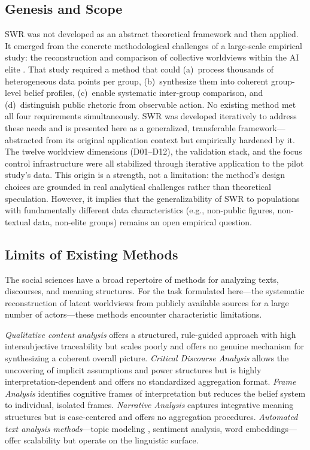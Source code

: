 \documentclass[11pt,a4paper]{article}
\theoremstyle{definition}
\theoremstyle{plain}
\theoremstyle{remark}
\begin{document}
\subsection{Genesis and Scope}

SWR was not developed as an abstract theoretical framework and then applied. It emerged from the concrete methodological challenges of a large-scale empirical study: the reconstruction and comparison of collective worldviews within the AI elite \citep{Geiger2026b}. That study required a method that could (a)~process thousands of heterogeneous data points per group, (b)~synthesize them into coherent group-level belief profiles, (c)~enable systematic inter-group comparison, and (d)~distinguish public rhetoric from observable action. No existing method met all four requirements simultaneously. SWR was developed iteratively to address these needs and is presented here as a generalized, transferable framework---abstracted from its original application context but empirically hardened by it. The twelve worldview dimensions (D01--D12), the validation stack, and the focus control infrastructure were all stabilized through iterative application to the pilot study's data. This origin is a strength, not a limitation: the method's design choices are grounded in real analytical challenges rather than theoretical speculation. However, it implies that the generalizability of SWR to populations with fundamentally different data characteristics (e.g., non-public figures, non-textual data, non-elite groups) remains an open empirical question.

\subsection{Limits of Existing Methods}
\label{sec:limits}

The social sciences have a broad repertoire of methods for analyzing texts, discourses, and meaning structures. For the task formulated here---the systematic reconstruction of latent worldviews from publicly available sources for a large number of actors---these methods encounter characteristic limitations.

\emph{Qualitative content analysis} \citep{Mayring2022} offers a structured, rule-guided approach with high intersubjective traceability but scales poorly and offers no genuine mechanism for synthesizing a coherent overall picture. \emph{Critical Discourse Analysis} \citep{Fairclough1995} allows the uncovering of implicit assumptions and power structures but is highly interpretation-dependent \citep{Breeze2011} and offers no standardized aggregation format. \emph{Frame Analysis} \citep{Goffman1974, Entman1993} identifies cognitive frames of interpretation but reduces the belief system to individual, isolated frames. \emph{Narrative Analysis} \citep{Riessman2008} captures integrative meaning structures but is case-centered and offers no aggregation procedures. \emph{Automated text analysis methods}---topic modeling \citep{BleiNgJordan2003}, sentiment analysis, word embeddings---offer scalability but operate on the linguistic surface.
\end{document}
